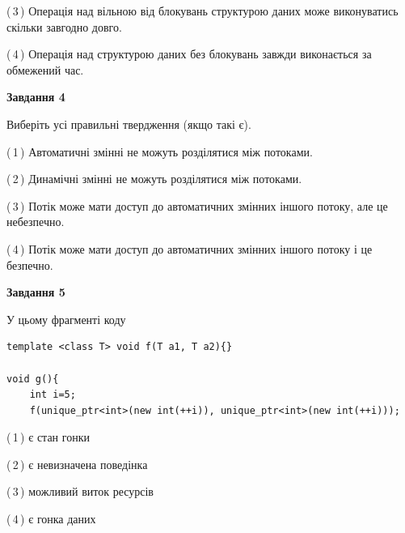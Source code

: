 \documentclass[12pt, ukrainian]{article}
\begin{document}
\begin {large}
{(\,3\,) Операція над вільною від блокувань структурою даних може виконуватись скільки завгодно довго.%

(\,4\,) Операція над структурою даних без блокувань завжди виконається за обмежений час.%



\begin{center}
\textbf{Завдання 4}
\end{center}
Виберіть усі правильні твердження (якщо такі є).\par
\vspace{2mm}

(\,1\,) Автоматичні змінні не можуть розділятися між потоками.%

(\,2\,) Динамічні змінні не можуть розділятися між потоками.%

(\,3\,) Потік може мати доступ до автоматичних змінних іншого потоку, але це небезпечно.%

(\,4\,) Потік може мати доступ до автоматичних змінних іншого потоку і це безпечно.%



\begin{center}
\textbf{Завдання 5}
\end{center}
У цьому фрагменті коду
\begin{verbatim}
template <class T> void f(T a1, T a2){}

void g(){
    int i=5;
    f(unique_ptr<int>(new int(++i)), unique_ptr<int>(new int(++i)));
\end{verbatim}

(\,1\,) є стан гонки%

(\,2\,) є невизначена поведінка%

(\,3\,) можливий виток ресурсів%

(\,4\,) є гонка даних%


}
\end {large}
\end{document}
